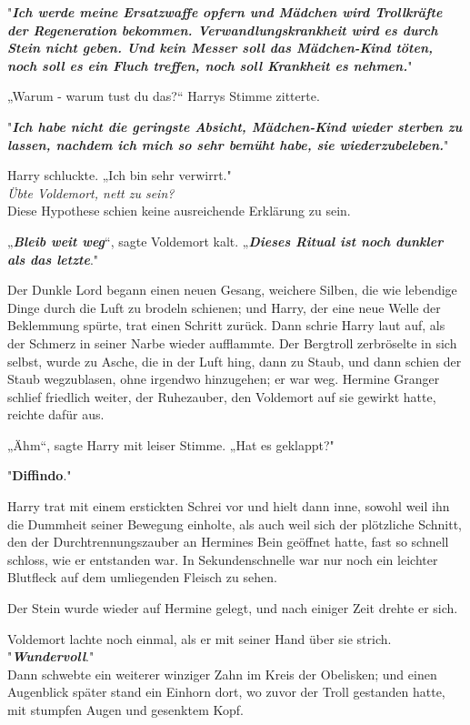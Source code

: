 {"\textbf{\emph{Ich werde meine Ersatzwaffe opfern und Mädchen wird Trollkräfte der Regeneration bekommen. Verwandlungskrankheit wird es durch Stein nicht geben. Und kein Messer soll das Mädchen-Kind töten, noch soll es ein Fluch treffen, noch soll Krankheit es nehmen.}}"

„Warum - warum tust du das?“ Harrys Stimme zitterte.

"\textbf{\emph{Ich habe nicht die geringste Absicht, Mädchen-Kind wieder sterben zu lassen, nachdem ich mich so sehr bemüht habe, sie wiederzubeleben.}}"

Harry schluckte. „Ich bin sehr verwirrt."\\ \emph{Übte Voldemort, nett zu sein?}\\ Diese Hypothese schien keine ausreichende Erklärung zu sein.

„\textbf{\emph{Bleib weit weg}}“, sagte Voldemort kalt. „\textbf{\emph{Dieses Ritual ist noch dunkler als das letzte}}."

Der Dunkle Lord begann einen neuen Gesang, weichere Silben, die wie lebendige Dinge durch die Luft zu brodeln schienen; und Harry, der eine neue Welle der Beklemmung spürte, trat einen Schritt zurück. Dann schrie Harry laut auf, als der Schmerz in seiner Narbe wieder aufflammte. Der Bergtroll zerbröselte in sich selbst, wurde zu Asche, die in der Luft hing, dann zu Staub, und dann schien der Staub wegzublasen, ohne irgendwo hinzugehen; er war weg. Hermine Granger schlief friedlich weiter, der Ruhezauber, den Voldemort auf sie gewirkt hatte, reichte dafür aus.

„Ähm“, sagte Harry mit leiser Stimme. „Hat es geklappt?"

"\textbf{Diffindo}."

Harry trat mit einem erstickten Schrei vor und hielt dann inne, sowohl weil ihn die Dummheit seiner Bewegung einholte, als auch weil sich der plötzliche Schnitt, den der Durchtrennungszauber an Hermines Bein geöffnet hatte, fast so schnell schloss, wie er entstanden war. In Sekundenschnelle war nur noch ein leichter Blutfleck auf dem umliegenden Fleisch zu sehen.

Der Stein wurde wieder auf Hermine gelegt, und nach einiger Zeit drehte er sich.

Voldemort lachte noch einmal, als er mit seiner Hand über sie strich.\\ "\textbf{\emph{Wundervoll}}."\\ Dann schwebte ein weiterer winziger Zahn im Kreis der Obelisken; und einen Augenblick später stand ein Einhorn dort, wo zuvor der Troll gestanden hatte, mit stumpfen Augen und gesenktem Kopf.

}
